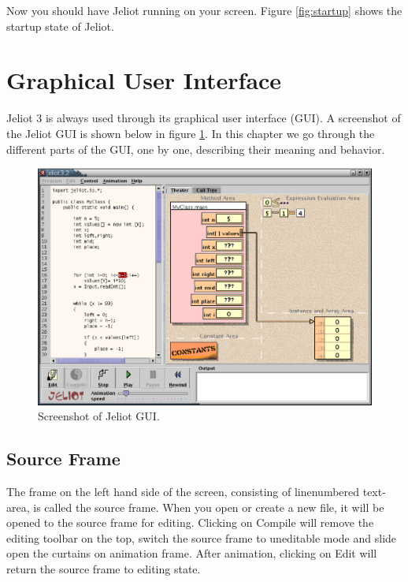 \documentclass[a4paper,11pt,english]{article}
\newcommand{\jel}{Jeliot}
\newcommand{\bu}[1]{\textsf{#1}}
\begin{document}
{Now you should have \jel{} running on your screen. Figure \ref{fig:startup} shows the startup state of \jel{}.

\section{Graphical User Interface}

\jel{} 3 is always used through its graphical user interface (GUI). A screenshot of the \jel{} GUI is shown below in figure \ref{fig:gui}. In this chapter we go through the different parts of the GUI, one by one, describing their meaning and behavior. 

\begin{figure}[ht]
\begin{center}
\includegraphics{images/wholegui.eps}
\caption{\label{fig:gui}Screenshot of \jel{} GUI.}
\end{center}
\end{figure}

\subsection{Source Frame}

The frame on the left hand side of the screen, consisting of linenumbered text-area, is called the source frame. When you open or create a new file, it will be opened to the source frame for editing. Clicking on \bu{Compile} will remove the editing toolbar on the top, switch the source frame to uneditable mode and slide open the curtains on animation frame. After animation, clicking on \bu{Edit} will return the source frame to editing state.

}
\end{document}
